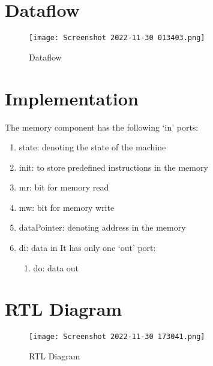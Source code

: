 \documentclass[10pt]{article}
\begin{document}
\subsection{\textbf{\color{blue}{Sign Extender}}}

\subsection{\textbf{\color{blue}{Sixteen Bit Adder}}}

\newpage

\section{\textbf{Dataflow}}

\begin{figure}[H]
    \centering
    \texttt{[image: Screenshot 2022-11-30 013403.png]}
	\caption{Dataflow}
    \label{fig:my_label3}
\end{figure}

\newpage

\section{\textbf{Implementation}}
The memory component has the following ‘in’ ports: 
\begin{enumerate}
\item state: denoting the state of the machine 
\item init: to store predefined instructions in the memory 
\item mr: bit for memory read 
\item mw: bit for memory write 
\item dataPointer: denoting address in the memory 
\item di: data in
It has only one ‘out’ port:
\begin{enumerate}
\item do: data out
\end{enumerate}
\end{enumerate}

\section{\textbf{RTL Diagram}}

\begin{figure}[H]
    \centering
    \texttt{[image: Screenshot 2022-11-30 173041.png]}
	\caption{RTL Diagram}
    \label{fig:my_label4}
\end{figure}
\end{document}
